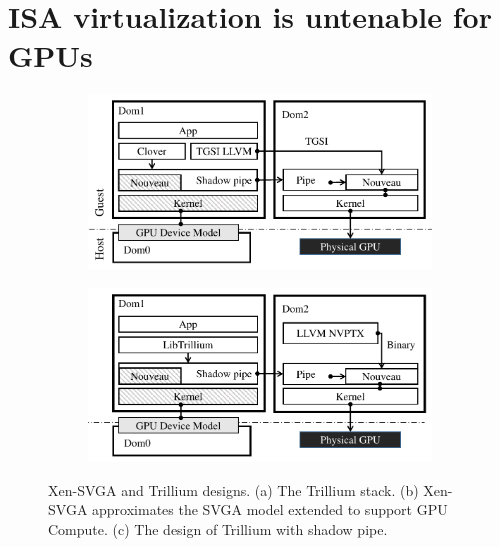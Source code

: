 \section{ISA virtualization is untenable for GPUs}
\label{sec:trillium}

\begin{figure}[!th]
	\centering
	\begin{subfigure}{0.45\linewidth}
		\includegraphics[width=\linewidth,trim={0 0 0 0},clip]{figures/xen-svga.pdf}
		\caption{{}}
		\label{fig_xen_svga}
	\end{subfigure}\hfill
	\begin{subfigure}{0.45\linewidth}
		\includegraphics[width=\linewidth,trim={0.6cm 0 0 0},clip]{figures/trillium.pdf}
		\caption{{}}
		\label{fig_trillium}
	\end{subfigure}
	\caption{Xen-SVGA and Trillium designs. (a) The Trillium stack. (b) Xen-SVGA approximates the SVGA model extended to support GPU Compute. (c) The design of Trillium with shadow pipe.}
\end{figure}

